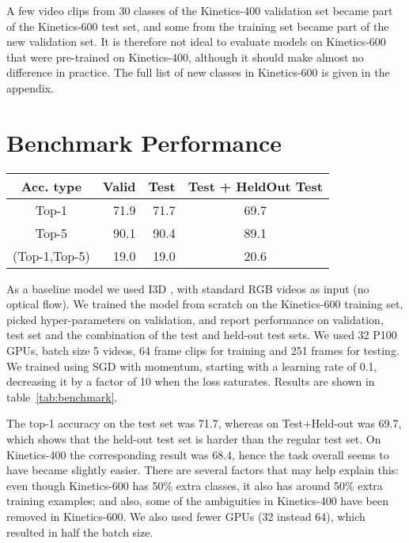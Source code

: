 \documentclass[10pt,twocolumn,letterpaper]{article}
\begin{document}
A few video clips from 30 classes of the Kinetics-400 validation set
became part of the Kinetics-600 test set, and some from the
training set became part of the new validation set. 
It is
therefore not ideal to evaluate  models on Kinetics-600 that were
pre-trained on Kinetics-400, although it should make almost no
difference in practice. The full list of new classes in Kinetics-600 is given in
the appendix.


\section{Benchmark Performance}

\begin{table*}
\centering
\begin{tabular}{| c| r | r | c |}
  \hline
  \textbf{Acc. type} & \textbf{Valid} & \textbf{Test} & \textbf{Test + HeldOut Test}  \\ \hline
Top-1 & 71.9 & 71.7 & 69.7  \\ \hline
Top-5 & 90.1 & 90.4 & 89.1  \\ \hline
(Top-1,Top-5) & 19.0 & 19.0 & 20.6 \\ \hline
\end{tabular} 
\vspace{5pt}
\caption{Performance of an I3D model with RGB inputs on the Kinetics-600 dataset, without any test time augmentation (processing a center crop of each video convolutionally in time ). The first two rows show accuracy in percentage, the last one shows the metric used at the Kinetics challenge hosted by the ActivityNet workshop.}
\label{tab:benchmark}
\end{table*}

As a baseline model we used I3D \cite{Carreira17}, with standard RGB videos as input (no optical flow). 
We trained the model from scratch on the Kinetics-600 training set, picked hyper-parameters on validation, and report performance on validation, test set and the combination of the test and held-out test sets. We used 32 P100 GPUs, batch size 5 videos, 64 frame clips for training and 251 frames for testing. We trained using SGD with momentum, starting with a learning rate of 0.1, decreasing it by a factor of 10 when the loss saturates. Results are shown in table~\ref{tab:benchmark}.

The top-1 accuracy on the test set was 71.7, whereas on Test+Held-out was 69.7, which shows that the held-out test set is harder than the regular test set. On Kinetics-400 the corresponding result was 68.4, hence the task overall seems to have became slightly easier. There are several factors that may help explain this: 
even though Kinetics-600 has 50\% extra classes, it also has around 50\% extra training examples; and also, 
some of the ambiguities in Kinetics-400 have been removed in Kinetics-600. 
We also used fewer GPUs (32 instead 64), which resulted in half the batch size.
\end{document}
